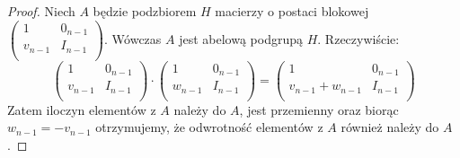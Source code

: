 \documentclass[licencjacka]{pracamgr}
\begin{document}
\begin{proof}
  Niech $A$ będzie podzbiorem $H$ macierzy o postaci blokowej
  $
    \left( \begin{array}{cc}
    1 & 0_{n-1} \\
    v_{n-1} & I_{n-1} \\
    \end{array} \right)
  $.
  Wówczas $A$ jest abelową podgrupą $H$.
  Rzeczywiście:
  $$
    \left( \begin{array}{cc} 1 & 0_{n-1} \\ v_{n-1} & I_{n-1} \\ \end{array} \right) \cdot
    \left( \begin{array}{cc} 1 & 0_{n-1} \\ w_{n-1} & I_{n-1} \\ \end{array} \right) =
    \left( \begin{array}{cc} 1 & 0_{n-1} \\ v_{n-1} + w_{n-1} & I_{n-1} \\ \end{array} \right)
  $$
  Zatem iloczyn elementów z $A$ należy do $A$, jest przemienny oraz biorąc $w_{n-1} = -v_{n-1}$
  otrzymujemy, że odwrotność elementów z $A$ również należy do $A$.
  

\end{proof}
\end{document}
